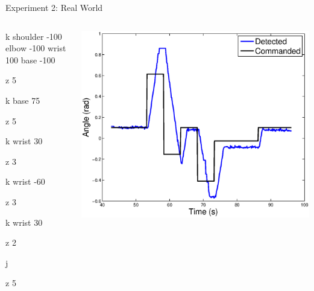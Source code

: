 \documentclass{beamer}
\begin{document}
\begin{frame}{Experiment 2: Real World}
\begin{columns}[t]

        \pause\pause
        \vspace{-1.3in}
        \begin{semiverbatim}
        \tiny
k shoulder -100 elbow -100 wrist 100 base -100

z 5

k base 75

z 5

k wrist 30

z 3

k wrist -60

z 3

k wrist 30

z 2

j

z 5
        \end{semiverbatim}
        \pause
        \includegraphics[width=\textwidth]{img/exp2b.eps}
      \end{columns}
    \end{frame}
\end{document}
